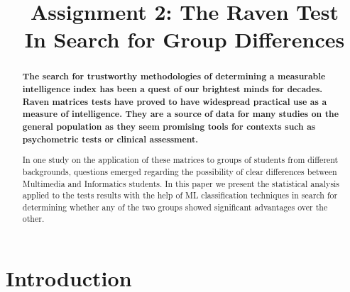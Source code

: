 \documentclass[extendedabs]{recpad2k}
\title{Assignment 2: The Raven Test \\ \LARGE{In Search for Group Differences}}
\begin{document}
\maketitle

\begin{abstract}
   \vspace{-10pt}
   {\bf 
      The search for trustworthy methodologies of determining a measurable intelligence index has been a quest of our brightest minds for decades.
      Raven matrices tests have proved to have widespread practical use as a measure of intelligence.
      They are a source of data for many studies on the general population as they seem promising tools for contexts such as psychometric tests or clinical assessment.

      In one study on the application of these matrices to groups of students from different backgrounds, questions emerged regarding the possibility of clear 
      differences between Multimedia and Informatics students.
      In this paper we present the statistical analysis applied to the tests results with the help of ML classification techniques in search for determining 
      whether any of the two groups showed significant advantages over the other.
   }
\end{abstract} 




\section{Introduction}
\end{document}
